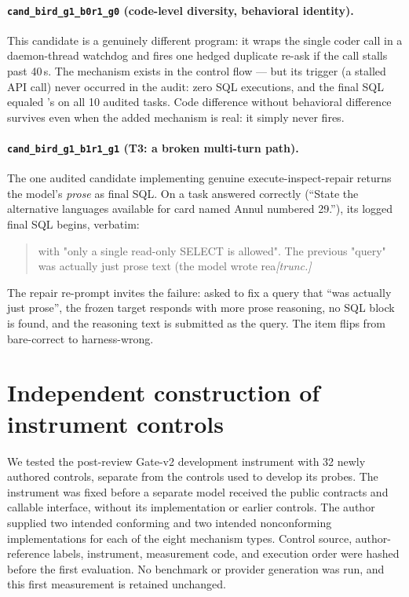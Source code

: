 \paragraph{\texttt{cand\_bird\_g1\_b0r1\_g0} (code-level diversity,
behavioral identity).} This candidate is a genuinely different program: it
wraps the single coder call in a daemon-thread watchdog and fires one hedged
duplicate re-ask if the call stalls past 40\,s. The mechanism exists in the
control flow --- but its trigger (a stalled API call) never occurred in the
audit: zero SQL executions, and the final SQL equaled \bare's on all 10
audited tasks. Code difference without behavioral difference survives even
when the added mechanism is real: it simply never fires.

\paragraph{\texttt{cand\_bird\_g1\_b1r1\_g1} (T3: a broken multi-turn
path).} The one audited candidate implementing genuine execute-inspect-repair
returns the model's \emph{prose} as final SQL. On a task \bare{} answered
correctly (``State the alternative languages available for card named Annul
numbered 29.''), its logged final SQL begins, verbatim:
\begin{quote}\small\ttfamily
with "only a single read-only SELECT is allowed". The previous "query" was
actually just prose text (the model wrote rea\emph{[trunc.]}
\end{quote}
The repair re-prompt invites the failure: asked to fix a query that ``was
actually just prose'', the frozen target responds with more prose reasoning,
no SQL block is found, and the reasoning text is submitted as the query. The
item flips from bare-correct to harness-wrong.

\section{Independent construction of instrument controls}\label{app:gatecontrols}
We tested the post-review Gate-v2 development instrument with 32 newly
authored controls, separate from the controls used to develop its probes.
The instrument was fixed before a separate model received the public
contracts and callable interface, without its implementation or earlier
controls. The author supplied two intended conforming and two intended
nonconforming implementations for each of the eight mechanism types.
Control source, author-reference labels, instrument, measurement code,
and execution order were hashed before the first evaluation. No benchmark
or provider generation was run, and this first measurement is retained unchanged.

